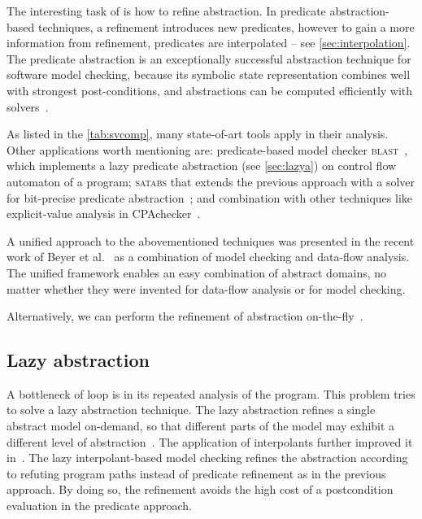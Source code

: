 \noindent
The interesting task of \cegar is how to refine abstraction. In predicate
abstraction-based techniques, a refinement introduces new predicates, however to
gain a more information from refinement, predicates are interpolated
\cite{Jhala2006} -- see \autoref{sec:interpolation}. The predicate abstraction
is an exceptionally successful abstraction technique for software model
checking, because its symbolic state representation combines well with
strongest post-conditions, and abstractions can be computed efficiently with
\smt solvers~\cite{Beyer2013}.

As listed in the \autoref{tab:svcomp}, many state-of-art tools apply \cegar in
their analysis. Other applications worth mentioning are: predicate-based model
checker \textsc{blast}~\cite{Henzinger2003, Beyer2005checking}, which
implements a lazy predicate abstraction (see \autoref{sec:lazya}) on control
flow automaton of a program; \textsc{satabs} that extends the previous approach
with a \sat solver for bit-precise predicate abstraction~\cite{Clarke2005satabs};
and combination with other techniques like explicit-value analysis in
CPAchecker~\cite{Beyer2013, Beyer2018e}.

A unified approach to the abovementioned techniques was presented in the recent
work of Beyer et al.~\cite{Beyer2018b} as a combination of model checking and
data-flow analysis. The unified framework enables an easy combination of
abstract domains, no matter whether they were invented for data-flow analysis
or for model checking.

Alternatively, we can perform the refinement of abstraction
on-the-fly~\cite{Beyer2008program}.

\subsection{Lazy abstraction}
\label{sec:lazya}

A bottleneck of \cegar loop is in its repeated analysis of the program. This
problem tries to solve a lazy abstraction technique. The lazy abstraction
refines a single abstract model on-demand, so that different parts of the model
may exhibit a different level of abstraction~\cite{Henzinger2002}. The application of
interpolants further improved it in~\cite{McMillan2006}. The lazy
interpolant-based model checking refines the abstraction according to refuting program paths
instead of predicate refinement as in the previous approach. By doing so,
the refinement avoids the high cost of a postcondition evaluation in the
predicate approach.

